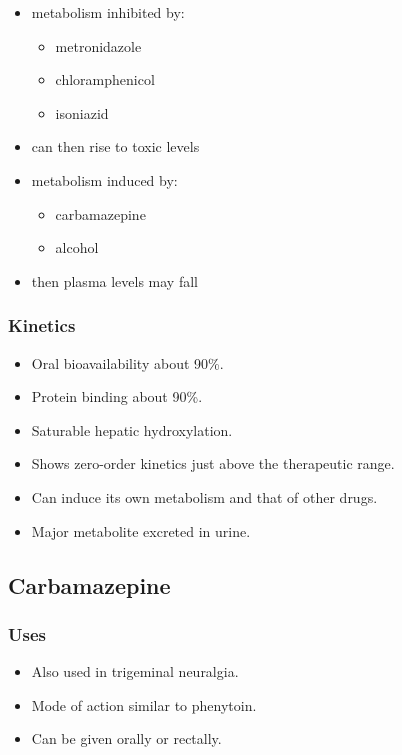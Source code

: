 \documentclass[11pt,a4paper]{article}
\begin{document}
\begin{itemize}
\begin{itemize}
\begin{itemize}
    \end{itemize}
    \item metabolism inhibited by:
    \begin{itemize}
      \item metronidazole
      \item chloramphenicol
      \item isoniazid
    \end{itemize}
    \item can then rise to toxic levels
    \item metabolism induced by:
    \begin{itemize}
      \item carbamazepine
      \item alcohol
    \end{itemize}
    \item then plasma levels may fall
  \end{itemize}
\end{itemize}

\subsubsection{Kinetics}
\begin{itemize}
  \item Oral bioavailability about 90\%.
  \item Protein binding about 90\%.
  \item Saturable hepatic hydroxylation.
  \item Shows zero-order kinetics just above the therapeutic range.
  \item Can induce its own metabolism and that of other drugs.
  \item Major metabolite excreted in urine.
\end{itemize}

\subsection{Carbamazepine}

\subsubsection{Uses}
\begin{itemize}
  \item Also used in trigeminal neuralgia.
  \item Mode of action similar to phenytoin.
  \item Can be given orally or rectally.
\end{itemize}
\end{document}
